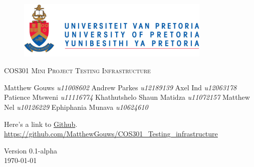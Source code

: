 \begin{titlepage}
	\begin{center}
		
		\begin{figure}[t]
			\centering
			\includegraphics[width=350px]{UP_Logo.png}
		\end{figure}
		
		\textsc{\LARGE COS301 Mini Project Testing \newline\newline Infrastructure}
		
		\begin{flushright} \large
			Matthew Gouws \emph{u11008602} \newline
			Andrew Parkes \emph{u12189139} \newline
			Axel Ind \emph{u12063178} \newline
			Patience Mtsweni \emph{u11116774} \newline
			Khathutshelo Shaun Matidza \emph{u11072157} \newline
			Matthew Nel \emph{u10126229} \newline
			Ephiphania Munava \emph{u10624610} \newline
		\end{flushright}
		
		\vfill
		
	Here's a link to \href{https://github.com/MatthewGouws/COS301_Testing_infrastructure}{Github}.\\
	\url{https://github.com/MatthewGouws/COS301_Testing_infrastructure}

	\vfill

	{\large Version 0.1-alpha}
	\\
	{\large \today}		
		
		
	\end{center}
\end{titlepage}
